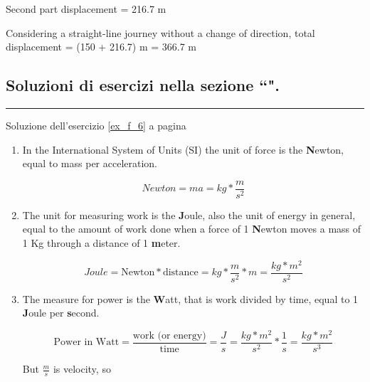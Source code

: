 Second part displacement = 216.7 m

Considering a straight-line journey without a change of direction,
total displacement = (150 + 216.7) m = 366.7 m


\subsection*{Soluzioni di esercizi nella sezione ``\textbf{}".}

\vspace{1cm}
\hrule
\vspace{1cm}

Soluzione dell'esercizio \ref{ex_f_6} a pagina \pageref{ex_f_6}\label{sol_f_6}

\begin{enumerate}
\item In the International System of Units (SI) the unit of force is the \textbf{N}ewton, equal to mass per acceleration.

\begin{equation}
Newton=ma=kg*\frac{m}{s^2}
\end{equation}

\item The unit for measuring work is the \textbf{J}oule, also the unit of energy in general, equal to the amount of work done when a force of 1 \textbf{N}ewton moves a mass of 1 Kg through a distance of 1 \textbf{m}eter. 

\begin{equation}
Joule=\textrm{Newton}*\textrm{distance}=kg*\frac{m}{s^2}*m=\frac{kg*m^2}{s^2}
\end{equation}

\item The measure for power is the \textbf{W}att, that is work divided by time, equal to 1 \textbf{J}oule per \textbf{s}econd.

\begin{equation}
\label{piw}
\textrm{Power in Watt}=\frac{\textrm{work (or energy)}}{\textrm{time}}=\frac{J}{s}=\frac{kg*m^2}{s^2}*\frac{1}{s}=\frac{kg*m^2}{s^3}
\end{equation}

% 
% 
% 
% 
But $\frac{m}{s}$ is velocity, so


\end{enumerate}
